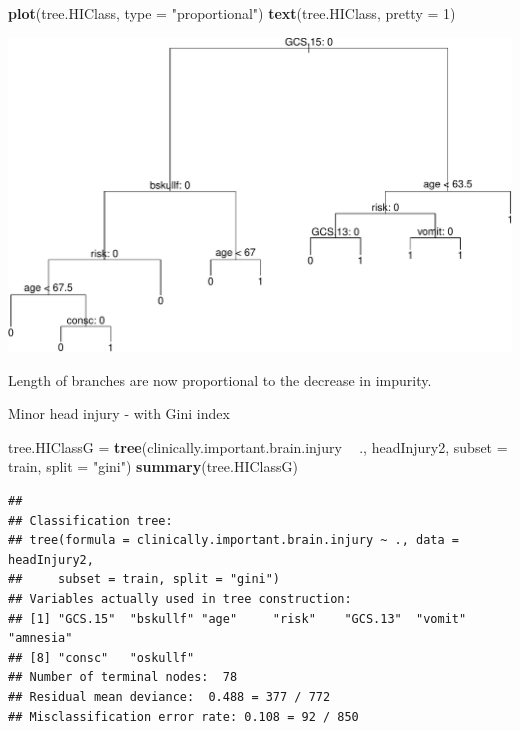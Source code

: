 \documentclass[ignorenonframetext,]{beamer}
\newenvironment{Shaded}{\begin{snugshade}}{\end{snugshade}}
\newcommand{\KeywordTok}[1]{\textcolor[rgb]{0.13,0.29,0.53}{\textbf{#1}}}
\newcommand{\DataTypeTok}[1]{\textcolor[rgb]{0.13,0.29,0.53}{#1}}
\newcommand{\DecValTok}[1]{\textcolor[rgb]{0.00,0.00,0.81}{#1}}
\newcommand{\StringTok}[1]{\textcolor[rgb]{0.31,0.60,0.02}{#1}}
\newcommand{\OperatorTok}[1]{\textcolor[rgb]{0.81,0.36,0.00}{\textbf{#1}}}
\newcommand{\NormalTok}[1]{#1}
\begin{document}
\begin{frame}[fragile]

\begin{Shaded}
\begin{Highlighting}[]
\KeywordTok{plot}\NormalTok{(tree.HIClass, }\DataTypeTok{type =} \StringTok{"proportional"}\NormalTok{)}
\KeywordTok{text}\NormalTok{(tree.HIClass, }\DataTypeTok{pretty =} \DecValTok{1}\NormalTok{)}
\end{Highlighting}
\end{Shaded}

\includegraphics{8TreesBEAMER_files/figure-beamer/unnamed-chunk-13-1.pdf}

Length of branches are now proportional to the decrease in impurity.

\end{frame}

\begin{frame}[fragile]

\begin{block}{Minor head injury - with Gini index}

\footnotesize

\begin{Shaded}
\begin{Highlighting}[]
\NormalTok{tree.HIClassG =}\StringTok{ }\KeywordTok{tree}\NormalTok{(clinically.important.brain.injury }\OperatorTok{~}\StringTok{ }\NormalTok{., headInjury2, }
    \DataTypeTok{subset =}\NormalTok{ train, }\DataTypeTok{split =} \StringTok{"gini"}\NormalTok{)}
\KeywordTok{summary}\NormalTok{(tree.HIClassG)}
\end{Highlighting}
\end{Shaded}

\begin{verbatim}
## 
## Classification tree:
## tree(formula = clinically.important.brain.injury ~ ., data = headInjury2, 
##     subset = train, split = "gini")
## Variables actually used in tree construction:
## [1] "GCS.15"  "bskullf" "age"     "risk"    "GCS.13"  "vomit"   "amnesia"
## [8] "consc"   "oskullf"
## Number of terminal nodes:  78 
## Residual mean deviance:  0.488 = 377 / 772 
## Misclassification error rate: 0.108 = 92 / 850
\end{verbatim}

\normalsize

\end{block}

\end{frame}
\end{document}
